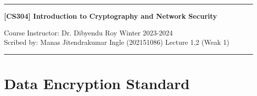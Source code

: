 \documentclass[11pt]{article}
\begin{document}
\noindent
\rule{\textwidth}{1pt}
\begin{center}
{\bf [CS304] Introduction to Cryptography and Network Security}
\end{center}
Course Instructor: Dr. Dibyendu Roy \hfill Winter 2023-2024\\
Scribed by: Manas Jitendrakumar Ingle (202151086) \hfill Lecture 1,2 (Weak 1)
\\
\rule{\textwidth}{1pt}

\section*{Data Encryption Standard}
\end{document}
